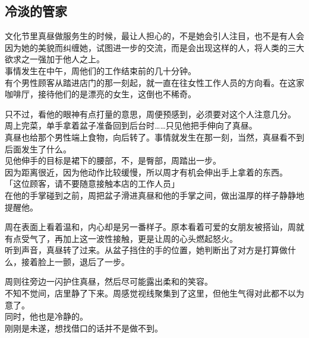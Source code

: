 \subsection{冷淡的管家}

文化节里真昼做服务生的时候，最让人担心的，不是她会引人注目，也不是有人会因为她的美貌而纠缠她，试图进一步的交流，而是会出现这样的人，将人类的三大欲求之一强加于他人之上。\\

事情发生在中午，周他们的工作结束前的几十分钟。\\

有个男性顾客从踏进店门的那一刻起，就一直在往女性工作人员的方向看。在这家咖啡厅，接待他们的是漂亮的女生，这倒也不稀奇。

只不过，看他的眼神有点打量的意思，周便预感到，必须要对这个人注意几分。\\

周上完菜，单手拿着盆子准备回到后台时……只见他把手伸向了真昼。\\

真昼也给那个男性端上食物，向后转了。事情就发生在那一刻，当然，真昼看不到后面发生了什么。\\

见他伸手的目标是裙下的腰部，不，是臀部，周踏出一步。\\

因为距离很近，因为他动作比较缓慢，所以周才有机会伸出手上拿着的东西。\\

「这位顾客，请不要随意接触本店的工作人员」\\

在他的手掌碰到之前，周把盆子滑进真昼和他的手掌之间，做出温厚的样子静静地提醒他。

周在表面上看着温和，内心却是另一番样子。原本看着可爱的女朋友被搭讪，周就有点受气了，再加上这一波性接触，更是让周的心头燃起怒火。\\

听到声音，真昼转了过来。从盆子挡住的手的位置，她判断出了对方是打算做什么，接着脸上一颤，退后了一步。

周则往旁边一闪护住真昼，然后尽可能露出柔和的笑容。\\

不知不觉间，店里静了下来。周感觉视线聚集到了这里，但他生气得对此都不以为意了。\\

同时，他也是冷静的。\\

刚刚是未遂，想找借口的话并不是做不到。


